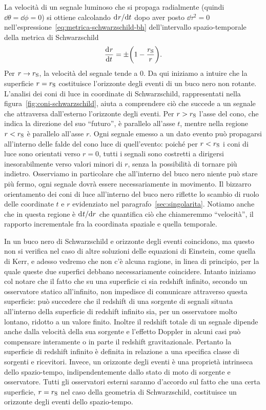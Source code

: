 La velocità di un segnale luminoso che si propaga radialmente (quindi
\(\dd\theta = \dd\phi = 0\)) si ottiene calcolando \(\mathrm{d}^{}r / \mathrm{d} {t}^{}\) dopo aver
posto \(\dd\tau^{2} = 0\) nell'espressione~\eqref{eq:metrica-schwarzschild-bh}
dell'intervallo spazio-temporale della metrica di Schwarzschild
\begin{equation}
  \frac{{\mathop{}\!\mathrm{d}^{}}r}{\mathop{}\!\mathrm{d} {t}^{}} = \pm \biggl(1 - \frac{r_{\textup{S}}}{r}\biggr).
\end{equation}
Per \(r \to r_{\textup{S}}\), la velocità del segnale tende a \(0\).  Da qui
iniziamo a intuire che la superficie \(r = r_{\textup{S}}\) costituisce
l'orizzonte degli eventi di un buco nero non rotante.  L'analisi dei coni di
luce in coordinate di Schwarzschild, rappresentati nella
figura~\ref{fig:coni-schwarzschild}, aiuta a comprendere ciò che succede a un
segnale che attraversa dall'esterno l'orizzonte degli eventi.  Per \(r >
r_{\textup{S}}\) l'asse del cono, che indica la direzione del suo ``futuro'', è
parallelo all'asse \(t\), mentre nella regione \(r < r_{\textup{S}}\) è
parallelo all'asse \(r\).  Ogni segnale emesso a un dato evento può propagarsi
all'interno delle falde del cono luce di quell'evento: poiché per \(r <
r_{\textup{S}}\) i coni di luce sono orientati verso \(r = 0\), tutti i segnali
sono costretti a dirigersi inesorabilmente verso valori minori di \(r\), senza
la possibilità di tornare più indietro.  Osserviamo in particolare che
all'interno del buco nero niente può stare più fermo, ogni segnale dovrà essere
necessariamente in movimento.  Il bizzarro orientamento dei coni di luce
all'interno del buco nero riflette lo scambio di ruolo delle coordinate \(t\) e
\(r\) evidenziato nel paragrafo~\ref{sec:singolarita}.  Notiamo anche che in
questa regione è \(\mathrm{d}^{}t / \mathrm{d} {r}^{}\) che quantifica ciò che chiameremmo
``velocità'', il rapporto incrementale fra la coordinata spaziale e quella
temporale.

In un buco nero di Schwarzschild e orizzonte degli eventi coincidono, ma questo
non si verifica nel caso di altre soluzioni delle equazioni di Einstein, come
quella di Kerr, e adesso vedremo che non c'è alcuna ragione, in linea di
principio, per la quale queste due superfici debbano necessariamente coincidere.
Intanto iniziamo col notare che il fatto che su una superficie ci sia redshift
infinito, secondo un osservatore statico all'infinito, non impedisce di
comunicare attraverso questa superficie: può succedere che il redshift di una
sorgente di segnali situata all'interno della superficie di redshift infinito
sia, per un osservatore molto lontano, ridotto a un valore finito.  Inoltre il
redshift totale di un segnale dipende anche dalla velocità della sua sorgente e
l'effetto Doppler in alcuni casi può compensare interamente o in parte il
redshift gravitazionale.  Pertanto la superficie di redshift infinito è definita
in relazione a una specifica classe di sorgenti e ricevitori.  Invece, un
orizzonte degli eventi è una proprietà intrinseca dello spazio-tempo,
indipendentemente dallo stato di moto di sorgente e osservatore.  Tutti gli
osservatori esterni saranno d'accordo sul fatto che una certa superficie, \(r =
r_{\textup{S}}\) nel caso della geometria di Schwarzschild, costituisce un
orizzonte degli eventi dello spazio-tempo.

